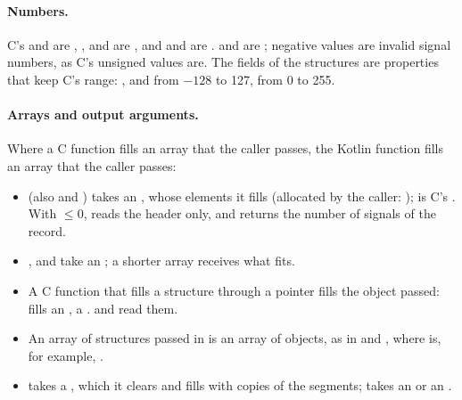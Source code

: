 \paragraph{Numbers.} C's  and  are ,
,  and  are , and 
and  are .  and 
are ; negative values are invalid signal numbers, as C's unsigned values are.
The  fields of the structures are  properties that keep C's range:
,  and  from $-128$ to 127,  from 0 to
255.

\paragraph{Arrays and output arguments.} Where a C function fills an array that the caller
passes, the Kotlin function fills an array that the caller passes:
\begin{itemize}
\item {} (also  and )
  takes an , whose elements it fills (allocated by the caller:
  );  is C's . With 
  $\le 0$,  reads the header only, and returns the number of signals of the
  record.
\item {},  and  take an ;
  a shorter array receives what fits.
\item A C function that fills a structure through a pointer fills the object passed:
   fills an ,  a
  .  and  read them.
\item An array of structures passed in is an array of objects, as in
   and , where
   is, for example, .
\item {} takes a , which it clears and
  fills with copies of the segments;  takes an
   or an .
\end{itemize}

